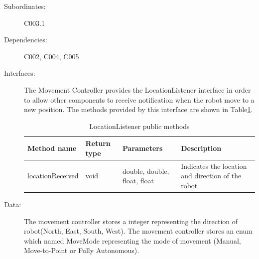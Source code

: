 \documentclass[12pt]{article}
\begin{document}
\begin{description}
\item[{Subordinates: }] C003.1
\item[{Dependencies: }] C002, C004, C005
\item[{Interfaces: }] The Movement Controller provides the LocationListener interface in order to allow other components to receive notification when the robot move to a new position. The methods provided by this interface are shown in Table\ref{table:locationlistener}.

\begin{table}[!hpt]
\begin{tabular}{ | p{} | p{} |p{}|p{}|}
\hline
\textbf{Method name} & \textbf{Return type} & \textbf{Parameters} & \textbf{Description} \\
\hline
locationReceived & void & double, double, float, float & Indicates the location and direction of the robot \\
\hline
\end{tabular}
\caption{LocationListener public methods}
\label{table:locationlistener}
\end{table}

\item[{Data: }] The movement controller stores a integer representing the direction of robot(North, East, South, West). The movement controller stores an enum which named MoveMode representing the mode of movement (Manual, Move-to-Point or Fully Autonomous).
\end{description}

\FloatBarrier
\end{document}
